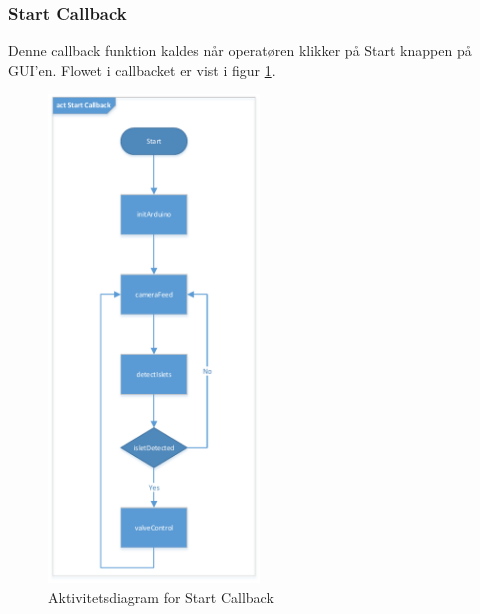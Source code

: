 \subsubsection{Start Callback}
Denne callback funktion kaldes når operatøren klikker på Start knappen på GUI'en. Flowet i callbacket er vist i figur \ref{fig:act_start}.
\begin{figure}[H]
	\centering
	\includegraphics[width=0.5\textwidth]{billeder/act_start-crop.pdf}
	\caption{Aktivitetsdiagram for Start Callback}
	\label{fig:act_start}
\end{figure}

\newpage

